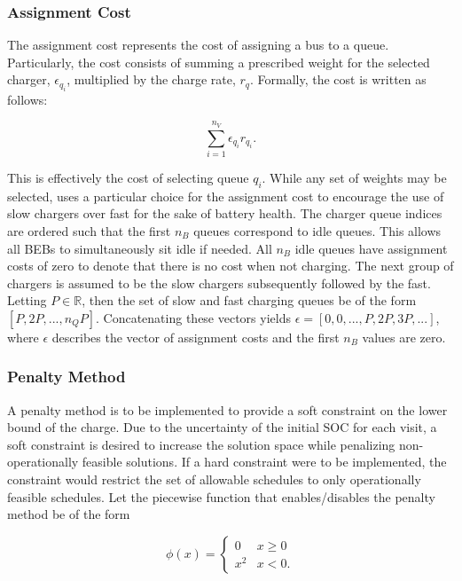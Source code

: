 \documentclass[ee,thesis]{usuthesis}
\begin{document}
\subsubsection{Assignment Cost}
\label{sec:sa-assignment-cost}
The assignment cost represents the cost of assigning a bus to a queue. Particularly, the cost consists of summing a
prescribed weight for the selected charger, \(\epsilon_{q_i}\), multiplied by the charge rate, \(r_q\). Formally, the cost is
written as follows:

\begin{equation}
\label{eq:assignment-cost}
\sum_{i=1}^{n_V} \epsilon_{q_i}r_{q_i}\text{.}
\end{equation}

This is effectively the cost of selecting queue \(q_i\). While any set of weights may be selected, uses a
particular choice for the assignment cost to encourage the use of slow chargers over fast for the sake of battery
health. The charger queue indices are ordered such that the first \(n_B\) queues correspond to idle queues. This allows
all BEBs to simultaneously sit idle if needed. All \(n_B\) idle queues have assignment costs of zero to denote that there
is no cost when not charging. The next group of chargers is assumed to be the slow chargers subsequently followed by the
fast. Letting \(P \in \mathbb{R}\), then the set of slow and fast charging queues be of the form \([P, 2P, ..., n_QP]\). Concatenating
these vectors yields \(\epsilon = [0, 0, ..., P, 2P, 3P, ...]\), where \(\epsilon\) describes the vector of assignment costs and the first
\(n_B\) values are zero.

\subsubsection{Penalty Method}
\label{sec:sa-penalty-method}
A penalty method is to be implemented to provide a soft constraint on the lower bound of the charge. Due to the
uncertainty of the initial SOC for each visit, a soft constraint is desired to increase the solution space while
penalizing non-operationally feasible solutions. If a hard constraint were to be implemented, the constraint would
restrict the set of allowable schedules to only operationally feasible schedules. Let the piecewise function that
enables/disables the penalty method be of the form

\begin{equation}
\label{eq:penalty}
  \phi(x) =
  \begin{cases}
    0   & x \ge 0 \\
    x^2 & x < 0\text{.}
  \end{cases}
\end{equation}
\end{document}
